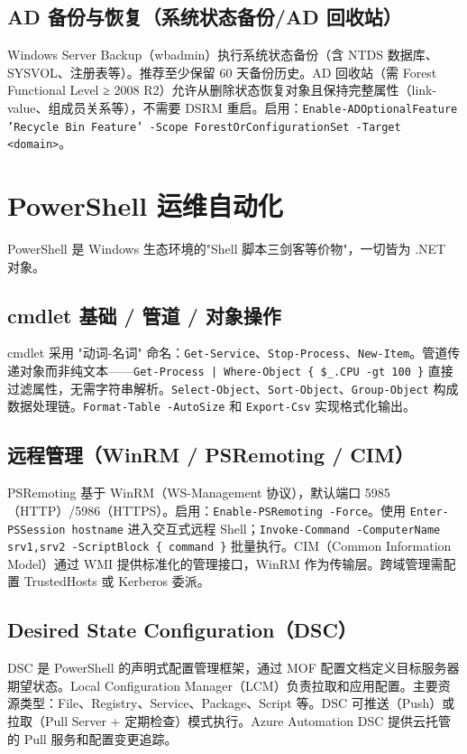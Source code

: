 \documentclass[12pt,UTF8]{ctexbook}
\begin{document}
    \subsection{AD 备份与恢复（系统状态备份/AD 回收站）}

Windows Server Backup（wbadmin）执行系统状态备份（含 NTDS 数据库、SYSVOL、注册表等）。推荐至少保留 60 天备份历史。AD 回收站（需 Forest Functional Level ≥ 2008 R2）允许从删除状态恢复对象且保持完整属性（link-value、组成员关系等），不需要 DSRM 重启。启用：\texttt{Enable-ADOptionalFeature 'Recycle Bin Feature' -Scope ForestOrConfigurationSet -Target <domain>}。

  \section{PowerShell 运维自动化}

PowerShell 是 Windows 生态环境的"Shell 脚本三剑客等价物"，一切皆为 .NET 对象。

\subsection{cmdlet 基础 / 管道 / 对象操作}

cmdlet 采用 "动词-名词" 命名：\verb+Get-Service+、\verb+Stop-Process+、\verb+New-Item+。管道传递对象而非纯文本——\verb+Get-Process | Where-Object { $_.CPU -gt 100 }+ 直接过滤属性，无需字符串解析。\verb+Select-Object+、\verb+Sort-Object+、\verb+Group-Object+ 构成数据处理链。\verb+Format-Table -AutoSize+ 和 \verb+Export-Csv+ 实现格式化输出。

    \subsection{远程管理（WinRM / PSRemoting / CIM）}

PSRemoting 基于 WinRM（WS-Management 协议），默认端口 5985（HTTP）/5986（HTTPS）。启用：\texttt{Enable-PSRemoting -Force}。使用 \texttt{Enter-PSSession hostname} 进入交互式远程 Shell；\texttt{Invoke-Command -ComputerName srv1,srv2 -ScriptBlock \{ command \}} 批量执行。CIM（Common Information Model）通过 WMI 提供标准化的管理接口，WinRM 作为传输层。跨域管理需配置 TrustedHosts 或 Kerberos 委派。

    \subsection{Desired State Configuration（DSC）}

DSC 是 PowerShell 的声明式配置管理框架，通过 MOF 配置文档定义目标服务器期望状态。Local Configuration Manager（LCM）负责拉取和应用配置。主要资源类型：File、Registry、Service、Package、Script 等。DSC 可推送（Push）或拉取（Pull Server + 定期检查）模式执行。Azure Automation DSC 提供云托管的 Pull 服务和配置变更追踪。
\end{document}
